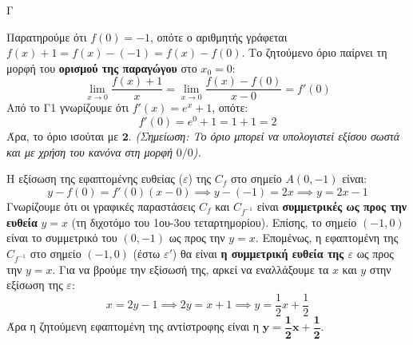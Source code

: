 \begin{thema}{Γ}
\begin{erwthma}
\item Παρατηρούμε ότι $f(0) = -1$, οπότε ο αριθμητής γράφεται $f(x) + 1 = f(x) - (-1) = f(x) - f(0)$.
Το ζητούμενο όριο παίρνει τη μορφή του \textbf{ορισμού της παραγώγου} στο $x_0 = 0$:
\[ \lim_{x \to 0} \frac{f(x) + 1}{x} = \lim_{x \to 0} \frac{f(x) - f(0)}{x - 0} = f'(0) \]
Από το Γ1 γνωρίζουμε ότι $f'(x) = e^x + 1$, οπότε:
\[ f'(0) = e^0 + 1 = 1 + 1 = 2 \]
Άρα, το όριο ισούται με $\boldsymbol{2}$.
\textit{(Σημείωση: Το όριο μπορεί να υπολογιστεί εξίσου σωστά και με χρήση του κανόνα  στη μορφή $0/0$).}

\item Η εξίσωση της εφαπτομένης ευθείας ($\varepsilon$) της $C_f$ στο σημείο $A(0, -1)$ είναι:
\[ y - f(0) = f'(0)(x - 0) \implies y - (-1) = 2x \implies y = 2x - 1 \]
Γνωρίζουμε ότι οι γραφικές παραστάσεις $C_f$ και $C_{f^{-1}}$ είναι \textbf{συμμετρικές ως προς την ευθεία} $y = x$ (τη διχοτόμο του 1ου-3ου τεταρτημορίου). Επίσης, το σημείο $(-1, 0)$ είναι το συμμετρικό του $(0, -1)$ ως προς την $y=x$.
Επομένως, η εφαπτομένη της $C_{f^{-1}}$ στο σημείο $(-1, 0)$ (έστω $\varepsilon'$) θα είναι \textbf{η συμμετρική ευθεία της $\varepsilon$} ως προς την $y = x$.
Για να βρούμε την εξίσωσή της, αρκεί να εναλλάξουμε τα $x$ και $y$ στην εξίσωση της $\varepsilon$:
\[ x = 2y - 1 \implies 2y = x + 1 \implies y = \frac{1}{2}x + \frac{1}{2} \]
Άρα η ζητούμενη εφαπτομένη της αντίστροφης είναι η $\boldsymbol{y = \dfrac{1}{2}x + \dfrac{1}{2}}$.
\end{erwthma}
\end{thema}

